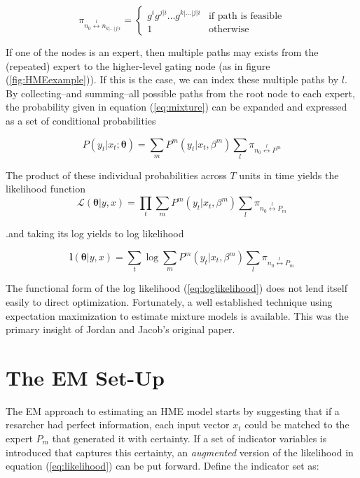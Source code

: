 \documentclass[12pt]{article}
\begin{document}
\begin{equation} \label{eq:gpath}
  \pi_{n_{0} \overset{l}{\longleftrightarrow} n_{k|\ldots|j|i}} =
    \begin{cases} 
       g^{i}g^{j|i} \ldots g^{k|\dots|j|i} & \textrm{if path is feasible} \\
       1 & \textrm{otherwise}
    \end{cases}
\end{equation}

If one of the nodes is an expert, then multiple paths may exists from the (repeated) expert to the higher-level gating node (as in figure (\ref{fig:HMEexample})). If this is the case, we can index these multiple paths by $l$. By collecting--and summing--all possible paths from the root node to each expert, the probability given in equation (\ref{eq:mixture}) can be expanded and expressed as a set of conditional probabilities

\begin{equation} \label{eq:contribution}
  P(y_{t}|x_{t};\boldsymbol{\theta}) = \sum_{m}P^{m}(y_{t}|x_{t},\beta^{m})\sum_{l}\pi_{n_{0} \overset{l}{\longleftrightarrow} P^{m}}
\end{equation}

The product of these individual probabilities across $T$ units in time yields the likelihood function
\begin{equation} \label{eq:likelihood}
  \mathcal{L}(\boldsymbol{\theta}|y,x) = \prod_{t}\sum_{m}P^{m}(y_{t}|x_{t},\beta^{m})\sum_{l}\pi_{n_{0} \overset{l}{\longleftrightarrow} P_{m}}
\end{equation}

.and taking its log yields to log likelihood

\begin{equation} \label{eq:loglikelihood}
  \boldsymbol{l}(\boldsymbol{\theta}|y,x) = \sum_{t}\log\sum_{m}P^{m}(y_{t}|x_{t},\beta^{m})\sum_{l}\pi_{n_{0}\overset{l}{\longleftrightarrow} P_{m}}
\end{equation}

The functional form of the log likelihood (\ref{eq:loglikelihood}) does not lend itself easily to direct optimization. Fortunately, a well established technique using expectation maximization \cite{EM_DLR} to estimate mixture models is available. This was the primary insight of Jordan and Jacob's \cite{JordanJacobsHME} original paper.

\section{The EM Set-Up}
The EM approach to estimating an HME model starts by suggesting that if a resarcher had perfect information, each input vector $x_{t}$ could be matched to the expert $P_{m}$ that generated it with certainty. If a set of indicator variables is introduced that captures this certainty, an \textit{augmented} version of the likelihood in equation (\ref{eq:likelihood}) can be put forward. Define the indicator set as:
\end{document}
